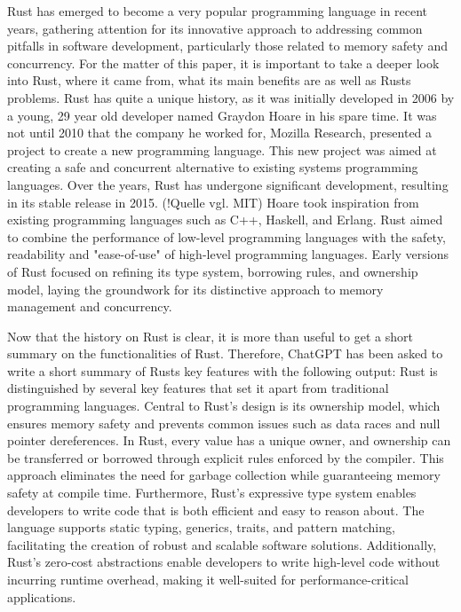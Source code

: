 Rust has emerged to become a very popular programming language in recent years, gathering attention for its innovative approach to addressing common pitfalls in software development, particularly those related to memory safety and concurrency. For the matter of this paper, it is important to take a deeper look into Rust, where it came from, what its main benefits are as well as Rusts problems. 
Rust has quite a unique history, as it was initially developed in 2006 by a young, 29 year old developer named Graydon Hoare in his spare time. It was not until 2010 that the company he worked for, Mozilla Research, presented a project to create a new programming language. This new project was aimed at creating a safe and concurrent alternative to existing systems programming languages. Over the years, Rust has undergone significant development, resulting in its stable release in 2015. (!Quelle vgl. MIT) Hoare took inspiration from existing programming languages such as C++, Haskell, and Erlang. Rust aimed to combine the performance of low-level programming languages with the safety, readability and "ease-of-use" of high-level programming languages. Early versions of Rust focused on refining its type system, borrowing rules, and ownership model, laying the groundwork for its distinctive approach to memory management and concurrency.

Now that the history on Rust is clear, it is more than useful to get a short summary on the functionalities of Rust. Therefore, ChatGPT has been asked to write a short summary of Rusts key features with the following output:
Rust is distinguished by several key features that set it apart from traditional programming languages. Central to Rust's design is its ownership model, which ensures memory safety and prevents common issues such as data races and null pointer dereferences. In Rust, every value has a unique owner, and ownership can be transferred or borrowed through explicit rules enforced by the compiler. This approach eliminates the need for garbage collection while guaranteeing memory safety at compile time. Furthermore, Rust's expressive type system enables developers to write code that is both efficient and easy to reason about. The language supports static typing, generics, traits, and pattern matching, facilitating the creation of robust and scalable software solutions. Additionally, Rust's zero-cost abstractions enable developers to write high-level code without incurring runtime overhead, making it well-suited for performance-critical applications.

